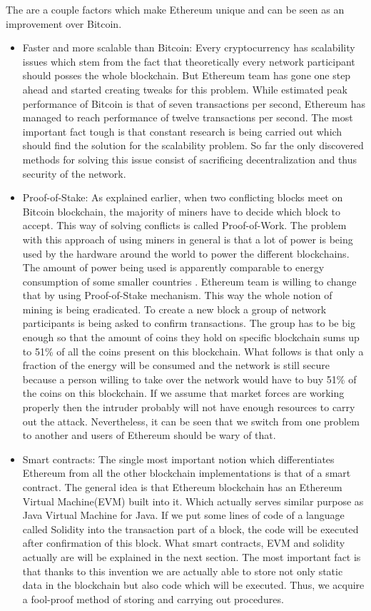 \documentclass[a4paper,12pt,twoside,openany]{report}
\begin{document}
The are a couple factors which make Ethereum unique and can be seen as an improvement over Bitcoin. 
\begin{itemize}
\item Faster and more scalable than Bitcoin: Every cryptocurrency has scalability issues which stem from the fact that theoretically every network participant should posses the whole blockchain. But Ethereum team has gone one step ahead and started creating tweaks for this problem. While estimated peak performance of Bitcoin is that of seven transactions per second, Ethereum has managed to reach performance of twelve transactions per second. The most important fact tough is that constant research is being carried out which should find the solution for the scalability problem. So far the only discovered methods for solving this issue consist of sacrificing decentralization and thus security of the network.

\item Proof-of-Stake: As explained earlier, when two conflicting blocks meet on Bitcoin blockchain, the majority of miners have to decide which block to accept. This way of solving conflicts is called Proof-of-Work. The problem with this approach of using miners in general is that a lot of power is being used by the hardware around the world to power the different blockchains. The amount of power being used is apparently comparable to energy consumption of some smaller countries \cite{energy}.  Ethereum team is willing to change that by using Proof-of-Stake mechanism. This way the whole notion of mining is being eradicated. To create a new block a group of network participants is being asked to confirm transactions. The group has to be big enough so that the amount of coins they hold on specific blockchain sums up to 51\% of all the coins present on this blockchain. What follows is that only a fraction of the energy will be consumed and the network is still secure because a person willing to take over the network would have to buy 51\% of the coins on this blockchain. If we assume that market forces are working properly then the intruder probably will not have enough resources to carry out the attack. Nevertheless, it can be seen that we switch from one problem to another and users of Ethereum should be wary of that. 

\item Smart contracts: The single most important notion which differentiates Ethereum from all the other blockchain implementations is that of a smart contract. The general idea is that Ethereum blockchain has an Ethereum Virtual Machine(EVM) built into it. Which actually serves similar purpose as Java Virtual Machine for Java. If we put some lines of code of a language called Solidity into the transaction part of a block, the code will be executed after confirmation of this block. What smart contracts, EVM and solidity actually are will be explained in the next section. The most important fact is that thanks to this invention we are actually able to store not only static data in the blockchain but also code which will be executed. Thus, we acquire a fool-proof method of storing and carrying out procedures.
\end{itemize}
\end{document}
